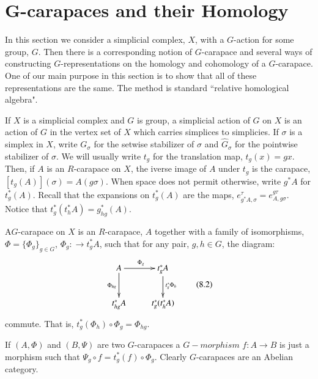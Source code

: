 \section{G-carapaces and their Homology}
In this section we consider a simplicial complex, $X$, with a $G$-action for some group, $G$. Then there is a corresponding notion of $G$-carapace and several ways of constructing $G$-representations on the homology and cohomology of a $G$-carapace. One of our main purpose in this section is to show that all of these representations are the same. The method is standard ``relative homological algebra".

If $X$ is a simplicial complex and $G$ is group, a simplicial action of $G$ on $X$ is an action of $G$ in the vertex set of $X$ which carries simplices to simplicies. If $\sigma$ is a simplex in $X$, write $G_{\sigma}$ for the setwise stabilizer of $\sigma$ and $\hat{G}_{\sigma}$ for the pointwise stabilizer of $\sigma$. We will usually write $t_{{g}}$ for the translation map, $t_{{g}}(x) ={g}x$. Then, if $A$ is an $R$-carapace on $X$, the iverse image of $A$ under $t_{{g}}$ is the carapace, $[t_{{g}}(A)](\sigma) = A({g}\sigma)$. When space does not permit otherwise, write ${g}^{*}A$ for $t_{{g}}^ {*}(A)$. Recall that the expansions on $t_{{g}}^{*}(A)$ are the maps, $e_{{g}^{*} A, \sigma}^\tau = e_{A, {g}\sigma}^{{g}\tau}$.
Notice that $t_{g}^{*}(t_{h}^{*}A) = g_{h{g}}^{*}(A)$.

\begin{definition}\label{chap6-defi-8.1}
A\pageoriginale $G$-carapace on $X$ is an $R$-carapace, $A$ together with a family of isomorphisms,
$\Phi = \{\Phi_{{g}}\}_{{g} \in G}$, $\Phi_{{g}} : \rightarrow t_{{g}}^{*} A$, such that for any pair, ${g}, h \in G$, the diagram: 
\begin{equation*}\label{chap6-eq-8.2}
\vcenter{
\xymatrix{
A  \ar[r]^{\Phi_{{g}}} \ar[d]_{\Phi_{h{g}}} & t^*_{{g}} A \ar[d]^{t_{{g}}^{*} \Phi_{h}}\\
t_{h{g}}^{*}A  & t_{{g}}^{*}(t_{h}^{*}A)
}}\tag{8.2}
\end{equation*}
commute. That is, $t_{{g}}^{*}(\Phi_{h}) \circ \Phi_{{g}} = \Phi_{h{g}}$.
\end{definition}

If $(A, \Phi)$ and $(B, \Psi)$ are two $G$-carapaces a $G-morphism$ $f: A\rightarrow B$ is just a morphism such that $\Psi_{{g}} \circ  f = t_{{g}}^{*}(f) \circ \Phi_{{g}}$.  Clearly $G$-carapaces are an Abelian category.

